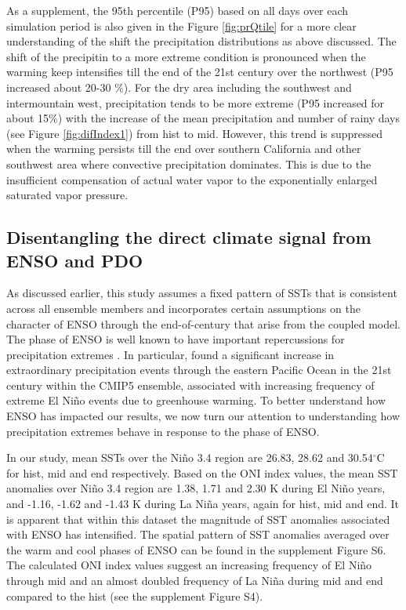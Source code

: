 \documentclass{ametsoc}
\begin{document}
As a supplement, the 95th percentile (P95) based on all days over each simulation period is also given in the Figure \ref{fig:prQtile} for a more clear understanding of the shift the precipitation distributions as above discussed. The shift of the precipitin to a more extreme condition is pronounced when the warming keep intensifies till the end of the 21st century over the northwest (P95 increased about 20-30 $\%$). For the dry area including the southwest and intermountain west, precipitation tends to be more extreme (P95 increased for about 15$\%$) with the increase of the mean precipitation and number of rainy days (see Figure \ref{fig:difIndex1}) from \textsf{hist} to \textsf{mid}. However, this trend is suppressed when the warming persists till the \textsf{end} over southern California and other southwest area where convective precipitation dominates. This is due to the insufficient compensation of actual water vapor to the exponentially enlarged saturated vapor pressure.

\subsection{Disentangling the direct climate signal from ENSO and PDO} \label{sec:IsolatingENSO}

As discussed earlier, this study assumes a fixed pattern of SSTs that is consistent across all ensemble members and incorporates certain assumptions on the character of ENSO through the end-of-century that arise from the coupled model.  The phase of ENSO is well known to have important repercussions for precipitation extremes \citep{larkin2005definition, allan2008atmospheric, maloney2014north, yoon2015increasing}. In particular, \cite{cai2014increasing} found a significant increase in extraordinary precipitation events through the eastern Pacific Ocean in the 21st century within the CMIP5 ensemble, associated with increasing frequency of extreme El Ni\~no events due to greenhouse warming.  To better understand how ENSO has impacted our results, we now turn our attention to understanding how precipitation extremes behave in response to the phase of ENSO.


In our study, mean SSTs over the Ni\~no 3.4 region are 26.83, 28.62 and 30.54$^\circ$C for \textsf{hist}, \textsf{mid} and \textsf{end} respectively. Based on the ONI index values, the mean SST anomalies over Ni\~no 3.4 region are 1.38, 1.71 and 2.30 K during El Ni\~no years, and -1.16, -1.62 and -1.43 K during La Ni\~na years, again for \textsf{hist}, \textsf{mid} and \textsf{end}. It is apparent that within this dataset the magnitude of SST anomalies associated with ENSO has intensified. The spatial pattern of SST anomalies averaged over the warm and cool phases of ENSO can be found in the supplement Figure S6. The calculated ONI index values suggest an increasing frequency of El Ni\~no through \textsf{mid} and an almost doubled frequency of La Ni\~na during \textsf{mid} and \textsf{end} compared to the \textsf{hist} (see the supplement Figure S4). 
\end{document}
